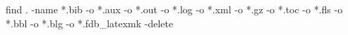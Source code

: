 \chapter{}

find . -name *.bib -o *.aux -o *.out -o *.log -o *.xml -o *.gz -o *.toc -o *.fls -o *.bbl -o *.blg -o *.fdb_latexmk -delete